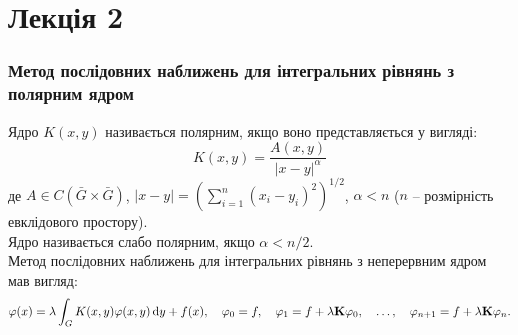 \section*{Лекція 2}

\subsubsection*{Метод послідовних наближень для інтегральних рівнянь з полярним ядром}

Ядро $K(x, y)$ називається полярним, якщо воно представляється у вигляді:
\begin{equation}
	\label{eq:1.20}
	K(x, y) = \dfrac{A(x, y)}{|x - y|^\alpha}
\end{equation}
де $A \in C(\bar G \times \bar G)$, $|x - y| = \left( \sum_{i = 1}^n (x_i - y_i)^2 \right)^{1/2}$, $\alpha < n$ ($n$ -- розмірність евклідового простору). \\

Ядро називається слабо полярним, якщо $\alpha < n / 2$. \\

Метод послідовних наближень для інтегральних рівнянь з неперервним ядром мав вигляд: \[ \varphi(x) = \lambda \int_G K(x, y) \varphi(x, y) \mathop{}\!\mathrm{d} y + f(x), \quad \varphi_0 = f, \quad \varphi_1 = f + \lambda \textbf{K} \varphi_0, \quad \ldots, \quad \varphi_{n + 1} = f + \lambda \textbf{K} \varphi_n. \]

